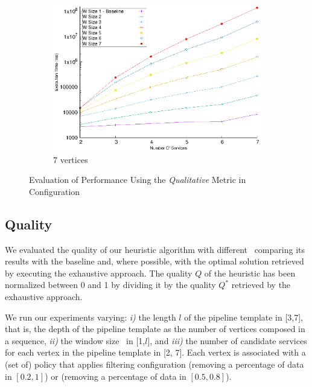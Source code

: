\begin{figure}[!t]
\begin{subfigure}{0.45\textwidth}
        \includegraphics[width=\textwidth]{Images/graphs/window_time_performance_qualitative_n7_s7_50_80_n7}
        \caption{7 vertices}
        \label{fig:time_window_perce_wide_7n}
      \end{subfigure}
      \caption{{\color{OurColor2}Evaluation of Performance Using the \emph{Qualitative} Metric in 
      Configuration \average}}
      \label{fig:time_window_perce_average}
    \end{figure}

    \subsection{Quality}\label{subsec:experiments_quality}
    We evaluated the quality of our heuristic algorithm with different \windowsize\ comparing its results with the baseline and, where possible, with the optimal solution retrieved by executing the exhaustive approach.
    The quality $Q$ of the heuristic has been normalized between 0 and 1 by dividing it by the quality $Q^*$ retrieved by the exhaustive approach.

    We run our experiments varying: \emph{i)} the length $l$ of the pipeline template in [3,7], that is, the depth of the pipeline template as the number of vertices composed in a sequence, \emph{ii)} the window size \windowsize\ in [1,$l$], and \emph{iii)} the number of candidate services for each vertex in the pipeline template in [2, 7]. Each vertex is associated with a (set of) policy that applies filtering configuration \wide (removing a percentage of data in $[0.2,1]$) or \average (removing a percentage of data in $[0.5,0.8]$).

